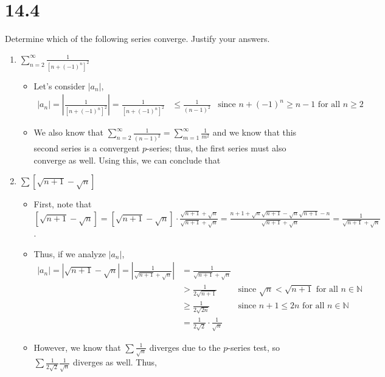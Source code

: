 \documentclass[10pt,a4paper]{article}
\theoremstyle{definition}
\begin{document}
\section*{14.4}
Determine which of the following series converge. Justify your answers.
\begin{enumerate}[label = (\alph*)]
\item $\displaystyle \sum_{n = 2}^{\infty} \frac{1}{[n + (-1)^n]^2}$
	\begin{itemize}
	\item Let's consider $|a_n|$,
	\begin{align*}
	|a_n| = \left|\frac{1}{[n + (-1)^n]^2}\right| = \frac{1}{[n + (-1)^n]^2} &\leq \frac{1}{(n - 1)^2} &\text{since $n + (-1)^n \geq n - 1$ for all $n \geq 2$}
	\end{align*}
	\item We also know that $\displaystyle \sum_{n = 2}^{\infty} \frac{1}{(n - 1)^2} = \sum_{m = 1}^{\infty} \frac{1}{m^2}$ and we know that this second series is a convergent $p$-series; thus, the first series must also converge as well. Using this, we can conclude that \\
	\end{itemize}
\item $\displaystyle \sum \left[\sqrt{n + 1} - \sqrt{n}\right]$
	\begin{itemize}
	\item First, note that $\displaystyle \left[\sqrt{n + 1} - \sqrt{n}\right] = \left[\sqrt{n + 1} - \sqrt{n}\right] \cdot \frac{\sqrt{n + 1} + \sqrt{n}}{\sqrt{n + 1} + \sqrt{n}} = \frac{n + 1 + \sqrt{n}\sqrt{n + 1} - \sqrt{n}\sqrt{n+1} - n}{\sqrt{n + 1} + \sqrt{n}} = \frac{1}{\sqrt{n + 1} + \sqrt{n}}$.
	\item Thus, if we analyze $|a_n|$, 
	\begin{align*}
	|a_n| = \left|\sqrt{n + 1} - \sqrt{n}\right| = \left|\frac{1}{\sqrt{n + 1} + \sqrt{n}}\right| &= \frac{1}{\sqrt{n + 1} + \sqrt{n}}\\
	&> \frac{1}{2\sqrt{n + 1}} &\text{since $\sqrt{n} < \sqrt{n +1}$ for all $n \in \mathbb{N}$}\\
	&\geq \frac{1}{2\sqrt{2n}} &\text{since $n + 1 \leq 2n$ for all $n \in \mathbb{N}$}\\
	&= \frac{1}{2\sqrt{2}} \cdot \frac{1}{\sqrt{n}}
	\end{align*}
	\item However, we know that $\sum \frac{1}{\sqrt{n}}$ diverges due to the $p$-series test, so $\sum \frac{1}{2\sqrt{2}}\frac{1}{\sqrt{n}}$ diverges as well. Thus, \\

\end{itemize}
\end{enumerate}
\end{document}
